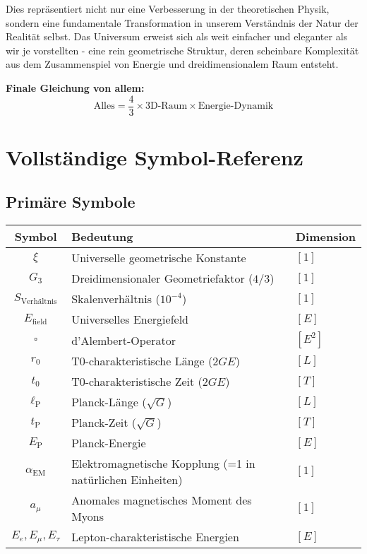 \documentclass[12pt,a4paper]{report}
\newcommand{\EP}{E_{\text{P}}}            %
\newcommand{\lP}{\ell_{\text{P}}}         %
\newcommand{\tP}{t_{\text{P}}}            %
\newcommand{\rzero}{r_0}                  %
\newcommand{\tzero}{t_0}                  %
\begin{document}
	Dies repräsentiert nicht nur eine Verbesserung in der theoretischen Physik, sondern eine fundamentale Transformation in unserem Verständnis der Natur der Realität selbst. Das Universum erweist sich als weit einfacher und eleganter als wir je vorstellten - eine rein geometrische Struktur, deren scheinbare Komplexität aus dem Zusammenspiel von Energie und dreidimensionalem Raum entsteht.
	
	\textbf{Finale Gleichung von allem:}
	\begin{equation}
		\boxed{\text{Alles} = \frac{4}{3} \times \text{3D-Raum} \times \text{Energie-Dynamik}}
	\end{equation}
	
	\appendix
	\chapter{Vollständige Symbol-Referenz}
	\label{app:complete_symbols}
	
	\section{Primäre Symbole}
	\label{sec:primary_symbols}
	
	\begin{longtable}{|c|l|l|}
		\hline
		\textbf{Symbol} & \textbf{Bedeutung} & \textbf{Dimension} \\
		\hline
		$\xi$ & Universelle geometrische Konstante & $[1]$ \\
		$G_3$ & Dreidimensionaler Geometriefaktor ($4/3$) & $[1]$ \\
		$S_{\text{Verhältnis}}$ & Skalenverhältnis ($10^{-4}$) & $[1]$ \\
		$E_{\text{field}}$ & Universelles Energiefeld & $[E]$ \\
		$\square$ & d'Alembert-Operator & $[E^2]$ \\
		$\rzero$ & T0-charakteristische Länge ($2GE$) & $[L]$ \\
		$\tzero$ & T0-charakteristische Zeit ($2GE$) & $[T]$ \\
		$\lP$ & Planck-Länge ($\sqrt{G}$) & $[L]$ \\
		$\tP$ & Planck-Zeit ($\sqrt{G}$) & $[T]$ \\
		$\EP$ & Planck-Energie & $[E]$ \\
		$\alpha_{\text{EM}}$ & Elektromagnetische Kopplung (=1 in natürlichen Einheiten) & $[1]$ \\
		$a_\mu$ & Anomales magnetisches Moment des Myons & $[1]$ \\
		$E_e, E_\mu, E_\tau$ & Lepton-charakteristische Energien & $[E]$ \\
		\hline
	\end{longtable}
	
\end{document}
